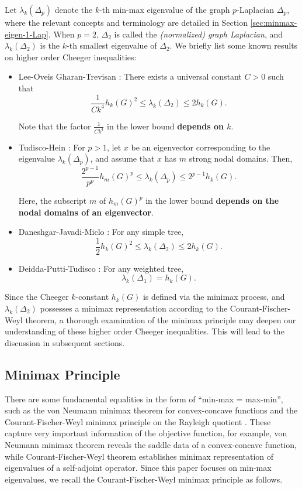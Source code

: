 \documentclass[12pt, reqno]{article}
\begin{document}
Let $\lambda_{k}(\Delta_p)$ denote the $k$-th min-max eigenvalue of the graph $p$-Laplacian $\Delta_p$, where the relevant concepts and terminology are detailed in Section \ref{sec:minmax-eigen-1-Lap}. When $p=2$, $\Delta_2$ is called the \emph{(normalized) graph Laplacian}, and $\lambda_{k}(\Delta_2)$ is the $k$-th smallest eigenvalue of $\Delta_2$.  
We briefly list some known results on higher order Cheeger inequalities: 
\begin{itemize}
\item 
Lee-Oveis Gharan-Trevisan \cite{Lee-Gharan-Trevisan}: 
There exists a universal constant $C>0$ such that
$$\frac{1}{Ck^4}h_k(G)^2\le\lambda_k(\Delta_2)\le2h_k(G).$$

Note that the factor $\frac{1}{Ck^4}$ in the lower bound \textbf{depends on $k$}.
\item
Tudisco-Hein \cite{Tudisco}: For $p>1$, let $x$ be an eigenvector corresponding to the eigenvalue $\lambda_k(\Delta_p)$, and assume that $x$ has $m$ strong nodal domains. Then, $$ \frac{2^{p-1}}{p^p}h_m(G)^p\le\lambda_k(\Delta_p)\le 2^{p-1}h_k(G).$$

Here, the subscript $m$ of $h_m(G)^p$ in the lower bound \textbf{depends on the nodal domains of an eigenvector}. 
\item
Daneshgar-Javadi-Miclo \cite{Daneshgar,Miclo}: For any simple tree, 
$$\frac{1}{2}h_k(G)^2\le \lambda_{k}(\Delta_2)\le 2 h_k(G).$$

\item
Deidda-Putti-Tudisco \cite{Deidda}: For any weighted tree, $$\lambda_{k}(\Delta_1)= h_k(G).$$ 

\end{itemize}
Since the Cheeger $k$-constant $h_k(G)$ is defined via the minimax process, and $\lambda_{k}(\Delta_2)$ possesses a minimax representation according to the Courant-Fischer-Weyl theorem, a thorough examination of the minimax principle may deepen our understanding of these higher order Cheeger inequalities. This will lead to the discussion in subsequent sections.

\subsection{Minimax Principle}
There are some fundamental‌ equalities in the form of ``min-max = max-min'', such as the von Neumann minimax theorem for convex-concave functions \cite{Rockafellar} and the Courant-Fischer-Weyl minimax principle on the Rayleigh quotient \cite{Bhatia}. 
These capture very important information of the objective function, for example, von Neumann minimax theorem reveals the saddle data of a convex-concave function, while Courant-Fischer-Weyl theorem establishes minimax representation of eigenvalues of a self-adjoint operator. Since this paper focuses on min-max eigenvalues, we recall the Courant-Fischer-Weyl minimax principle as follows.
\end{document}
